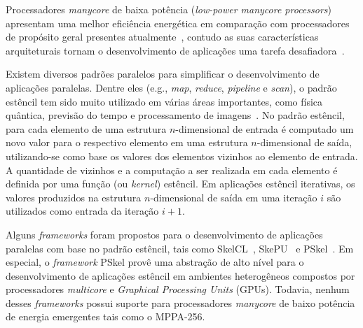 \documentclass[12pt]{article}
\newcommand{\fw}{\textit{framework}\xspace}
\newcommand{\fws}{\textit{frameworks}\xspace}
\newcommand{\mppa}{MPPA-256\xspace}
\begin{document}
Processadores \textit{manycore} de baixa potência (\textit{low-power manycore
    processors}) apresentam uma melhor eficiência energética em comparação com
processadores de propósito geral presentes
atualmente~\cite{Castro-IA3-JPDC:2014}, contudo as suas características
arquiteturais tornam o desenvolvimento de aplicações uma tarefa
desafiadora~\cite{Varghese14,Castro-PARCO:2016,Castro-SBAC-PAD:2014}.
%

Existem diversos padrões paralelos para simplificar o desenvolvimento de
aplicações paralelas. Dentre eles (e.g., \textit{map}, \textit{reduce},
\textit{pipeline} e \textit{scan}), o padrão estêncil tem sido muito utilizado
em várias áreas importantes, como física quântica, previsão do tempo e
processamento de imagens~\cite{gonzalez06,holewinski12,lutz13}. No padrão
estêncil, para cada elemento de uma estrutura $n$-dimensional de entrada é
computado um novo valor para o respectivo elemento em uma estrutura
$n$-dimensional de saída, utilizando-se como base os valores dos elementos
vizinhos ao elemento de entrada. A quantidade de vizinhos e a computação a ser
realizada em cada elemento é definida por uma função (ou \textit{kernel})
estêncil. Em aplicações estêncil iterativas, os valores produzidos na estrutura
$n$-dimensional de saída em uma iteração $i$ são utilizados como entrada da
iteração $i+1$.

Alguns \fws foram propostos para o desenvolvimento de aplicações paralelas com
base no padrão estêncil, tais como SkelCL~\cite{steuwer11},
SkePU~\cite{enmyren10} e PSkel~\cite{pereira15}. Em especial, o \fw PSkel provê
uma abstração de alto nível para o desenvolvimento de aplicações estêncil em
ambientes heterogêneos compostos por processadores \textit{multicore} e
\textit{Graphical Processing Units} (GPUs). Todavia, nenhum desses \fws possui
suporte para processadores \textit{manycore} de baixo potência de energia
emergentes tais como o \mppa.
\end{document}
